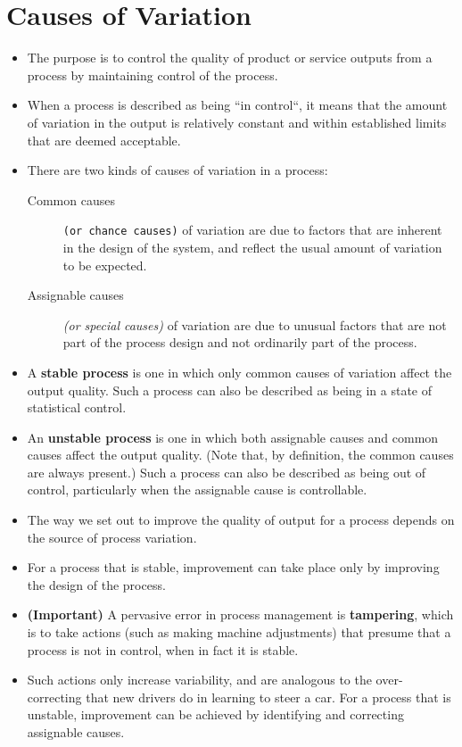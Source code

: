 \documentclass[]{report}
\begin{document}
{\section{Causes of Variation}
\begin{itemize}
	\item The purpose is to control the quality of product or service outputs from a process by
	maintaining control of the process.
	\item When a process is described as being ``in control``, it means that the amount of
	variation in the output is relatively constant and within established limits that are
	deemed acceptable.
	\item There are two kinds of causes of variation in a process:
	\begin{description}
	\item[Common causes] \texttt{(or chance causes)} of variation are due to factors that are
	inherent in the design of the system, and reflect the usual amount of variation
	to be expected.
	\item[Assignable causes] \textit{(or special causes)} of variation are due to unusual
	factors that are not part of the process design and not ordinarily part of the
	process.
\end{description}
	\item A \textbf{stable process} is one in which only common causes of variation affect the output
	quality. Such a process can also be described as being in a state of statistical
	control.
	\item An \textbf{unstable process} is one in which both assignable causes and common causes
	affect the output quality. (Note that, by definition, the common causes are always
	present.)
	Such a process can also be described as being out of control, particularly when the
	assignable cause is controllable.
	\item The way we set out to improve the quality of output for a process depends on the
	source of process variation.
	\item For a process that is stable, improvement can take place only by improving the
	design of the process. 
	\item \textbf{(Important)} A pervasive error in process management is \textbf{tampering},
	which is to take actions (such as making machine adjustments) that presume that a
	process is not in control, when in fact it is stable.
	\item Such actions only increase variability, and are analogous to the over-correcting that
	new drivers do in learning to steer a car. For a process that is unstable, improvement
	can be achieved by identifying and correcting assignable causes.	
\end{itemize}


}
\end{document}
